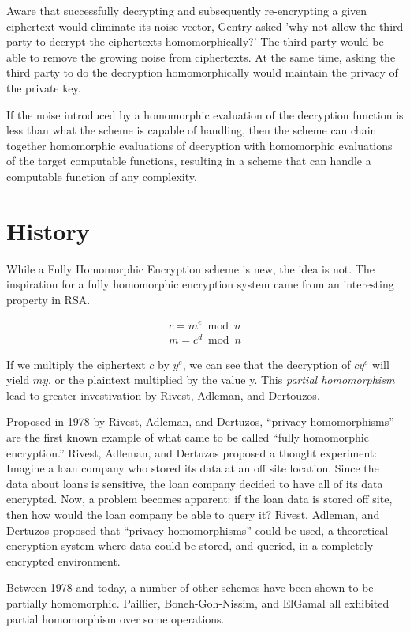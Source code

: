\documentclass[a4paper,10pt]{article}
\begin{document}
Aware that successfully decrypting and subsequently re-encrypting a
given ciphertext would eliminate its noise vector, Gentry asked 'why
not allow the third party to decrypt the ciphertexts homomorphically?'
The third party would be able to remove the growing noise from
ciphertexts. At the same time, asking the third party to do the
decryption homomorphically would maintain the privacy of the private
key.

If the noise introduced by a homomorphic evaluation of the decryption
function is less than what the scheme is capable of handling, then the
scheme can chain together homomorphic evaluations of decryption with
homomorphic evaluations of the target computable functions, resulting
in a scheme that can handle a computable function of any complexity.

\section{History}
While a Fully Homomorphic Encryption scheme is new, the idea is
not. The inspiration for a fully homomorphic encryption system came
from an interesting property in RSA.

\begin{eqnarray}
c = m ^{e} \bmod n\\
m = c ^{d} \bmod n 
\end{eqnarray}

If we multiply the ciphertext $c$ by $y ^{e}$, we can see that the
decryption of $ cy^{e} $ will yield $my$, or the plaintext multiplied
by the value y. This \textit{partial homomorphism} lead to greater
investivation by Rivest, Adleman, and Dertouzos.

Proposed in 1978 by Rivest, Adleman, and Dertuzos, ``privacy
homomorphisms'' are the first known example of what came to be called
``fully homomorphic encryption.'' Rivest, Adleman, and Dertuzos
proposed a thought experiment: Imagine a loan company who stored its
data at an off site location. Since the data about loans is sensitive,
the loan company decided to have all of its data encrypted. Now, a
problem becomes apparent: if the loan data is stored off site, then
how would the loan company be able to query it? Rivest, Adleman, and
Dertuzos proposed that ``privacy homomorphisms'' could be used, a
theoretical encryption system where data could be stored, and queried,
in a completely encrypted environment.

Between 1978 and today, a number of other schemes have been shown to
be partially homomorphic. Paillier, Boneh-Goh-Nissim, and ElGamal all
exhibited partial homomorphism over some operations.
\end{document}
